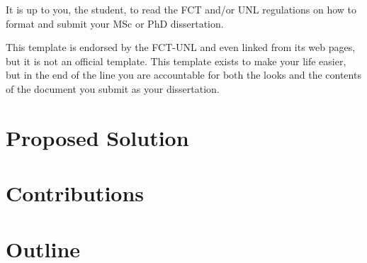 It is up to you, the student, to read the FCT and/or UNL regulations on how to format and submit your MSc or PhD dissertation.  

This template is endorsed by the FCT-UNL and even linked from its web pages, but it is not an official template.
%
This template exists to make your life easier, but in the end of the line you are accountable for both the looks and the contents of the document you submit as your dissertation.

\section{Proposed Solution} %
\label{sec:electric_motors_basics}





\section{Contributions} %
\label{sec:contributions}

\section{Outline} %
\label{sec:outline}

